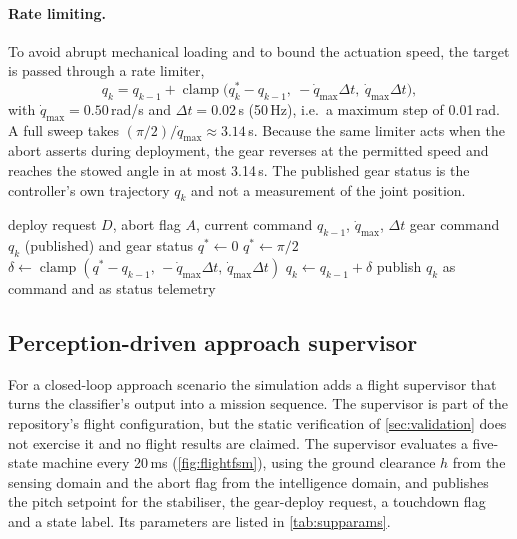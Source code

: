 \documentclass[11pt,a4paper]{article}
\begin{document}
\paragraph{Rate limiting.} To avoid abrupt mechanical loading and to bound the actuation speed, the target is passed through a rate limiter,
\begin{equation}
q_k=q_{k-1}+\operatorname{clamp}\bigl(q^\ast_k-q_{k-1},\ -\dot q_{\max}\Delta t,\ \dot q_{\max}\Delta t\bigr),
\end{equation}
with $\dot q_{\max}=0.50$\,rad/s and $\Delta t=0.02$\,s (50\,Hz), i.e.\ a maximum step of 0.01\,rad. A full sweep takes $(\pi/2)/\dot q_{\max}\approx3.14$\,s. Because the same limiter acts when the abort asserts during deployment, the gear reverses at the permitted speed and reaches the stowed angle in at most 3.14\,s. The published gear status is the controller's own trajectory $q_k$ and not a measurement of the joint position.
 
\begin{algorithm}[ht]
\caption{Landing gear controller step with abort interlock (50\,Hz)}\label{alg:gear}
\begin{algorithmic}[1]
\Require deploy request $D$, abort flag $A$, current command $q_{k-1}$, $\dot q_{\max}$, $\Delta t$
\Ensure gear command $q_k$ (published) and gear status
 \State $q^\ast\gets0$ \Else \State $q^\ast\gets\pi/2$ \EndIf
\State $\delta\gets\operatorname{clamp}(q^\ast-q_{k-1},\,-\dot q_{\max}\Delta t,\,\dot q_{\max}\Delta t)$
\State $q_k\gets q_{k-1}+\delta$
\State publish $q_k$ as command and as status telemetry
\end{algorithmic}
\end{algorithm}
 
\subsection{Perception-driven approach supervisor}\label{sec:supervisor}
For a closed-loop approach scenario the simulation adds a flight supervisor that turns the classifier's output into a mission sequence. The supervisor is part of the repository's flight configuration, but the static verification of \cref{sec:validation} does not exercise it and no flight results are claimed. The supervisor evaluates a five-state machine every 20\,ms (\cref{fig:flightfsm}), using the ground clearance $h$ from the sensing domain and the abort flag from the intelligence domain, and publishes the pitch setpoint for the stabiliser, the gear-deploy request, a touchdown flag and a state label. Its parameters are listed in \cref{tab:supparams}.
 
\end{document}
